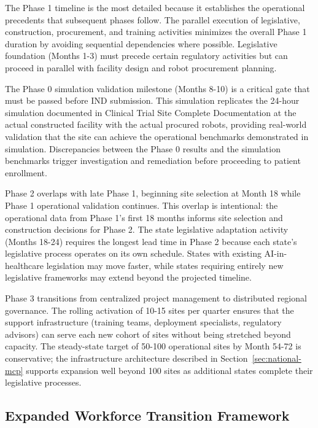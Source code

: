 The Phase 1 timeline is the most detailed because it establishes the
operational precedents that subsequent phases follow. The parallel execution
of legislative, construction, procurement, and training activities minimizes
the overall Phase 1 duration by avoiding sequential dependencies where
possible. Legislative foundation (Months 1-3) must precede certain regulatory
activities but can proceed in parallel with facility design and robot
procurement planning.

The Phase 0 simulation validation milestone (Months 8-10) is a critical gate
that must be passed before IND submission. This simulation replicates the
24-hour simulation documented in Clinical Trial Site Complete Documentation
\cite{site-docs} at the actual constructed facility with the actual procured
robots, providing real-world validation that the site can achieve the
operational benchmarks demonstrated in simulation. Discrepancies between
the Phase 0 results and the simulation benchmarks trigger investigation and
remediation before proceeding to patient enrollment.

Phase 2 overlaps with late Phase 1, beginning site selection at Month 18
while Phase 1 operational validation continues. This overlap is intentional:
the operational data from Phase 1's first 18 months informs site selection
and construction decisions for Phase 2. The state legislative adaptation
activity (Months 18-24) requires the longest lead time in Phase 2 because
each state's legislative process operates on its own schedule. States with
existing AI-in-healthcare legislation may move faster, while states requiring
entirely new legislative frameworks may extend beyond the projected timeline.

Phase 3 transitions from centralized project management to distributed
regional governance. The rolling activation of 10-15 sites per quarter
ensures that the support infrastructure (training teams, deployment
specialists, regulatory advisors) can serve each new cohort of sites without
being stretched beyond capacity. The steady-state target of 50-100 operational
sites by Month 54-72 is conservative; the infrastructure architecture
described in Section~\ref{sec:national-mcp} supports expansion well beyond
100 sites as additional states complete their legislative processes.

\subsection{Expanded Workforce Transition Framework}
\label{subsec:impl-expanded-workforce}

